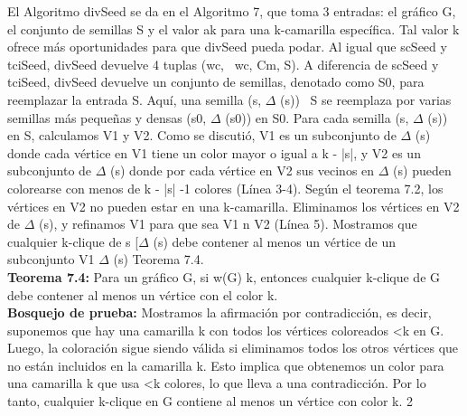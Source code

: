 El Algoritmo divSeed se da en el Algoritmo 7, que toma 3 entradas: el gráfico G, el conjunto de semillas S y el valor ak para una k-camarilla específica. Tal valor k ofrece más oportunidades para que divSeed pueda podar. Al igual que scSeed y tciSeed, divSeed devuelve 4 tuplas (wc, ~wc, Cm, S). A diferencia de scSeed y tciSeed, divSeed devuelve un conjunto de semillas, denotado como S0, para reemplazar la entrada S. Aquí, una semilla (s, \begin{math}\Delta\end{math} (s)) \ S se reemplaza por varias semillas más pequeñas y densas (s0, \begin{math}\Delta\end{math} (s0)) en S0. Para cada semilla (s, \begin{math}\Delta\end{math} (s)) en S, calculamos V1 y V2. Como se discutió, V1 es un subconjunto de \begin{math}\Delta\end{math} (s) donde cada vértice en V1 tiene un color mayor o igual a k - |s|, y V2 es un subconjunto de \begin{math}\Delta\end{math} (s) donde por cada vértice en V2 sus vecinos en \begin{math}\Delta\end{math} (s) pueden colorearse con menos de k - |s| -1 colores (Línea 3-4). Según el teorema 7.2, los vértices en V2 no pueden estar en una k-camarilla. Eliminamos los vértices en V2 de \begin{math}\Delta\end{math} (s), y refinamos V1 para que sea V1 n V2 (Línea 5). Mostramos que cualquier k-clique de s [\begin{math}\Delta\end{math} (s) debe contener al menos un vértice de un subconjunto V1 \begin{math}\Delta\end{math} (s) Teorema 7.4.
\\
\textbf{Teorema 7.4:} Para un gráfico G, si w(G) k, entonces cualquier k-clique de G debe contener al menos un vértice con el color k.
\\
\textbf{Bosquejo de prueba:} Mostramos la afirmación por contradicción, es decir, suponemos que hay una camarilla k con todos los vértices coloreados <k en G. Luego, la coloración sigue siendo válida si eliminamos todos los otros vértices que no están incluidos en la camarilla k. Esto implica que obtenemos un color para una camarilla k que usa <k colores, lo que lleva a una contradicción. Por lo tanto, cualquier k-clique en G contiene al menos un vértice con color k. 2
